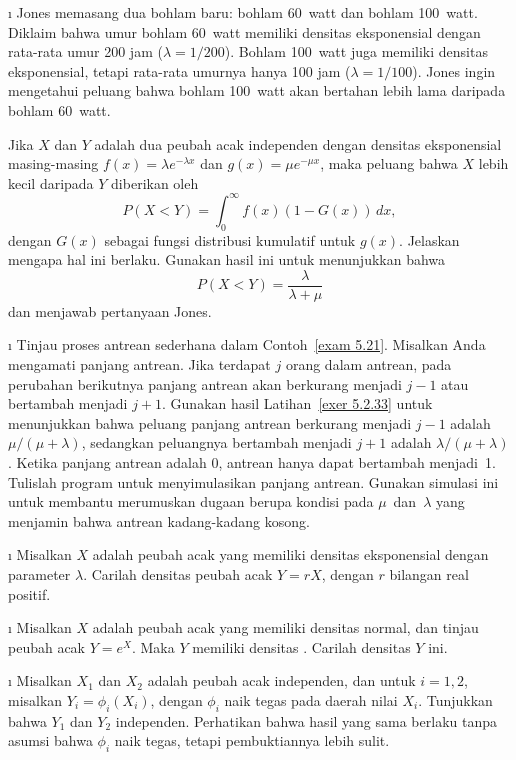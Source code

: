 \begin{LJSItem}
\i\label{exer 5.2.33} Jones memasang dua bohlam baru: bohlam 60~watt dan bohlam
100~watt.  Diklaim bahwa umur bohlam 60~watt memiliki densitas eksponensial dengan
rata-rata umur 200 jam ($\lambda = 1/200$).  Bohlam 100~watt juga memiliki densitas
eksponensial, tetapi rata-rata umurnya hanya 100 jam ($\lambda = 1/100$).  Jones ingin
mengetahui peluang bahwa bohlam 100~watt akan bertahan lebih lama daripada bohlam
60~watt.
\par
Jika $X$ dan $Y$ adalah dua peubah acak independen dengan densitas eksponensial
masing-masing $f(x) = \lambda e^{-\lambda x}$ dan $g(x) = \mu e^{-\mu x}$, maka
peluang bahwa $X$ lebih kecil daripada $Y$ diberikan oleh
$$ P(X < Y) = \int_0^\infty f(x)(1 - G(x))\,dx,
$$ dengan $G(x)$ sebagai fungsi distribusi kumulatif untuk $g(x)$.  Jelaskan mengapa
hal ini berlaku.  Gunakan hasil ini untuk menunjukkan bahwa
$$ P(X < Y) = \frac \lambda{\lambda + \mu}
$$ dan menjawab pertanyaan Jones.

\i\label{exer 5.2.34} Tinjau proses antrean sederhana dalam Contoh~\ref{exam
5.21}.  Misalkan Anda mengamati panjang antrean.  Jika terdapat $j$ orang dalam
antrean, pada perubahan berikutnya panjang antrean akan berkurang menjadi $j - 1$
atau bertambah menjadi $j + 1$.  Gunakan hasil Latihan~\ref{exer 5.2.33} untuk
menunjukkan bahwa peluang panjang antrean berkurang menjadi $j - 1$ adalah
$\mu/(\mu + \lambda)$, sedangkan peluangnya bertambah menjadi $j + 1$ adalah
$\lambda/(\mu + \lambda)$.  Ketika panjang antrean adalah 0, antrean hanya dapat
bertambah menjadi~1.  Tulislah program untuk menyimulasikan panjang antrean.  Gunakan
simulasi ini untuk membantu merumuskan dugaan berupa kondisi pada $\mu$~dan~$\lambda$
yang menjamin bahwa antrean kadang-kadang kosong.

\i\label{exer 5.2.36} Misalkan $X$ adalah peubah acak yang memiliki densitas
eksponensial dengan parameter $\lambda$.  Carilah densitas peubah acak $Y = rX$,
dengan $r$ bilangan real positif.

\i\label{exer 5.2.37} Misalkan $X$ adalah peubah acak yang memiliki densitas normal,
dan tinjau peubah acak $Y = e^X$.  Maka $Y$ memiliki densitas 
.  Carilah densitas $Y$ ini.

\i\label{exer 5.2.38} Misalkan $X_1$ dan $X_2$ adalah peubah acak independen, dan
untuk $i = 1, 2$, misalkan $Y_i = \phi_i(X_i)$, dengan $\phi_i$ naik tegas pada
daerah nilai $X_i$.  Tunjukkan bahwa $Y_1$ dan $Y_2$ independen.  Perhatikan bahwa
hasil yang sama berlaku tanpa asumsi bahwa $\phi_i$ naik tegas, tetapi pembuktiannya
lebih sulit.

\end{LJSItem}
%
